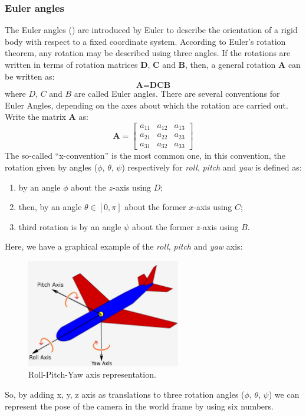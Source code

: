\subsubsection*{Euler angles}
The Euler angles (\cite{euler_angles}) are introduced by Euler to describe the orientation of a rigid body with respect to a fixed coordinate system.
According to Euler's rotation theorem, any rotation may be described using three angles.
If the rotations are written in terms of rotation matrices \textbf{D}, \textbf{C} and \textbf{B}, then, a general rotation \textbf{A} can be written as:
\begin{equation}
    \textbf{A} = \textbf{D} \textbf{C} \textbf{B}
    \label{eq:general_rotation}
\end{equation}
where $D$, $C$ and $B$ are called Euler angles.
There are several conventions for Euler Angles, depending on the axes about which the rotation are carried out.
Write the matrix \textbf{A} as:
\begin{equation}
    \textbf{A} = \begin{bmatrix}
                     a_{11} & a_{12} & a_{13} \\
                     a_{21} & a_{22} & a_{23} \\
                     a_{31} & a_{32} & a_{33}
    \end{bmatrix}
    \label{eq:matrix_A}
\end{equation}
The so-called ``x-convention'' is the most common one, in this convention, the rotation given by angles ($\phi$, $\theta$, $\psi$) respectively for \textit{roll}, \textit{pitch} and \textit{yaw} is defined as:
\begin{enumerate}
    \item by an angle $\phi$ about the $z$-axis using $D$;
    \item then, by an angle $\theta \in [0,\pi]$ about the former $x$-axis using $C$;
    \item third rotation is by an angle $\psi$ about the former $z$-axis using $B$.
\end{enumerate}
Here, we have a graphical example of the \textit{roll}, \textit{pitch} and \textit{yaw} axis:
\begin{figure}[H]
    \centering
    \includegraphics[width=0.6\textwidth]{images/2_2_roll_pitch_yaw}
    \caption{Roll-Pitch-Yaw axis representation.}\label{fig:euler-angles}
\end{figure}
So, by adding x, y, z axis as translations to three rotation angles ($\phi$, $\theta$, $\psi$) we can represent the pose of the camera in the world frame by using six numbers.
